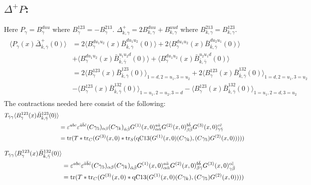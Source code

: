 \documentclass[12pt]{article}
\begin{document}
\subsection{$\Delta^+ P$:}
Here $P_\gamma = B^{duu}_\gamma$ where $B^{123}_\gamma = -B^{213}_\gamma$.
$\Delta^+_{k,\gamma} = 2 B^{duu}_{k,\gamma} + B^{uud}_{k,\gamma}$ 
where $B^{213}_{k,\gamma}=B^{123}_{k,\gamma}$.
%
\begin{gather*}
\begin{split}
\langle P_{\gamma}(x) \bar{\Delta}^+_{\bar{k},\bar{\gamma}}(0)\rangle
 &= 2\langle B^{d u_1 u_2}_{\gamma}(x) \bar{B}^{d u_1 u_2}_{\bar{k},\bar{\gamma}}(0)\rangle
  + 2\langle B^{d u_1 u_2}_{\gamma}(x) \bar{B}^{d u_2 u_1}_{\bar{k},\bar{\gamma}}(0)\rangle\\
 &+  \langle B^{d u_1 u_2}_{\gamma}(x) \bar{B}^{u_1 u_2 d}_{\bar{k},\bar{\gamma}}(0)\rangle
  +  \langle B^{d u_1 u_2}_{\gamma}(x) \bar{B}^{u_2 u_1 d}_{\bar{k},\bar{\gamma}}(0)\rangle\\
 &= 2\langle B^{123}_{\gamma}(x) \bar{B}^{123}_{\bar{k},\bar{\gamma}}(0)\rangle_{1=d,2=u_1,3=u_2}
  + 2\langle B^{123}_{\gamma}(x) \bar{B}^{132}_{\bar{k},\bar{\gamma}}(0)\rangle_{1=d,2=u_1,3=u_2}\\
 &-  \langle B^{123}_{\gamma}(x) \bar{B}^{132}_{\bar{k},\bar{\gamma}}(0)\rangle_{1=u_1,2=u_2,3=d}
  -  \langle B^{123}_{\gamma}(x) \bar{B}^{132}_{\bar{k},\bar{\gamma}}(0)\rangle_{1=u_1,2=d,3=u_2}
\end{split}
\end{gather*}
The contractions needed here consist of the following:
%
\begin{gather*}
\begin{split}
T_{\bar{\gamma}\gamma} \langle B^{123}_\gamma(x) \bar{B}^{123}_{\bar{k},\bar{\gamma}}(0)\rangle\\
 &= \varepsilon^{abc}\varepsilon^{\bar{a}\bar{b}\bar{c}} 
    (C\gamma_5)_{\alpha\beta} (C\gamma_k)_{\bar{\alpha}\bar{\beta}}
    G^{(1)}(x,0)^{a\bar{a}}_{\alpha\bar{\alpha}}
    G^{(2)}(x,0)^{b\bar{b}}_{\beta\bar{\beta}}
    G^{(3)}(x,0)^{c\bar{c}}_{\gamma\bar{\gamma}}\\
 &= {\rm tr}(T * {\rm tr}_C(G^{(3)}(x,0)
  * {\rm tr}_S({\rm qC13}(G^{(1)}(x,0)(C\gamma_k),(C\gamma_5)G^{(2)}(x,0)))))
\end{split}
\end{gather*}

\begin{gather*}
\begin{split}
T_{\bar{\gamma}\gamma} \langle B^{123}_\gamma(x) \bar{B}^{132}_{\bar{k},\bar{\gamma}}(0)\rangle\\
 &= \varepsilon^{abc}\varepsilon^{\bar{a}\bar{b}\bar{c}} 
    (C\gamma_5)_{\alpha\beta} (C\gamma_k)_{\bar{\alpha}\bar{\beta}}
    G^{(1)}(x,0)^{a\bar{a}}_{\alpha\bar{\alpha}}
    G^{(2)}(x,0)^{b\bar{b}}_{\beta\bar{\gamma}}
    G^{(3)}(x,0)^{c\bar{c}}_{\gamma\bar{\beta}}\\
 &= {\rm tr}(T * {\rm tr}_C(G^{(3)}(x,0)
 * {\rm qC13}(G^{(1)}(x,0)(C\gamma_k),(C\gamma_5)G^{(2)}(x,0))))
\end{split}
\end{gather*}
\end{document}
